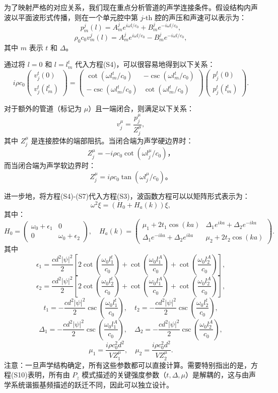 为了映射严格的对应关系，我们现在重点分析管道的声学连接条件。假设结构内声波以平面波形式传播，则在一个单元腔中第 \( j \)-th 腔的声压和声速可以表示为：
\[
p_m^j(l) = A_m^j e^{i\omega l/c_0} + B_m^j e^{-i\omega l/c_0},
\]
\[
\rho_0 c_0 v_m^j(l) = A_m^j e^{i\omega l/c_0} - B_m^j e^{-i\omega l/c_0}, 
\]
其中 \( m \) 表示 \( t \) 和 \( \Delta \)。

通过将 \( l = 0 \) 和 \( l = l_m^t \) 代入方程(S4)，可以很容易地得到以下关系：
\[
i\rho c_0
\begin{pmatrix}
v_j^t(0) \\
v_j^t(l_m^t)
\end{pmatrix}
=
\begin{pmatrix}
\cot(\omega l_m^t / c_0) & -\csc(\omega l_m^t / c_0) \\
-\csc(\omega l_m^t / c_0) & \cot(\omega l_m^t / c_0)
\end{pmatrix}
\begin{pmatrix}
p_j^t(0) \\
p_j^t(l_m^t)
\end{pmatrix}. 
\]

对于额外的管道（标记为 \( \mu \)）且一端闭合，则满足以下关系：
\[
v_j^\mu = \frac{p_j^\mu}{Z_j^\mu},
\]
其中 \( Z_j^\mu \) 是连接腔体的端部阻抗。当闭合端为声学硬边界时：
\[
Z_j^\mu = -i\rho c_0 \cot(\omega l_j^\mu / c_0)，
\]
而当闭合端为声学软边界时：
\[
Z_j^\mu = i\rho c_0 \tan(\omega l_j^\mu / c_0)。
\]

进一步地，将方程(S4)-(S7)代入方程(S3)，波函数方程可以以矩阵形式表示为：
\[
\omega^2 \xi = (H_0 + H_a(k)) \xi, 
\]
其中：
\[
H_0 =
\begin{pmatrix}
\omega_0 + \epsilon_1 & 0 \\
0 & \omega_0 + \epsilon_2
\end{pmatrix},
\quad
H_a(k) =
\begin{pmatrix}
\mu_1 + 2t_1\cos(ka) & \Delta_1 e^{ika} + \Delta_2 e^{-ika} \\
\Delta_1 e^{-ika} + \Delta_2 e^{ika} & \mu_2 + 2t_2\cos(ka)
\end{pmatrix}. 
\]
其中
\[
\epsilon_1 = \frac{cd^2 |\psi|^2}{2} \left[ 2\cot\left(\frac{\omega_0 l_1^t}{c_0}\right) + \cot\left(\frac{\omega_0 l_1^A}{c_0}\right) + \cot\left(\frac{\omega_0 l_2^A}{c_0}\right) \right],
\]
\[
\epsilon_2 = \frac{cd^2 |\psi|^2}{2} \left[ 2\cot\left(\frac{\omega_0 l_2^t}{c_0}\right) + \cot\left(\frac{\omega_0 l_1^A}{c_0}\right) + \cot\left(\frac{\omega_0 l_2^A}{c_0}\right) \right],
\]
\[
t_1 = -\frac{cd^2 |\psi|^2}{2} \csc\left(\frac{\omega_0 l_1^t}{c_0}\right), \quad
t_2 = -\frac{cd^2 |\psi|^2}{2} \csc\left(\frac{\omega_0 l_2^t}{c_0}\right),
\]
\[
\Delta_1 = -\frac{cd^2 |\psi|^2}{2} \csc\left(\frac{\omega_0 l_1^A}{c_0}\right), \quad
\Delta_2 = -\frac{cd^2 |\psi|^2}{2} \csc\left(\frac{\omega_0 l_2^A}{c_0}\right),
\]
\[
\mu_1 = \frac{i\rho c_0^2 d^2}{V Z_1^\mu}, \quad
\mu_2 = \frac{i\rho c_0^2 d^2}{V Z_2^\mu}. 
\]
注意：一旦声学结构确定，所有这些参数都可以直接计算。需要特别指出的是，方程(S10)表明，所有由 \( P_z \) 模式描述的关键强度参数（\( t, \Delta, \mu \)）是解耦的，这与由声学系统谐振基频描述的跃迁不同，因此可以独立设计。

